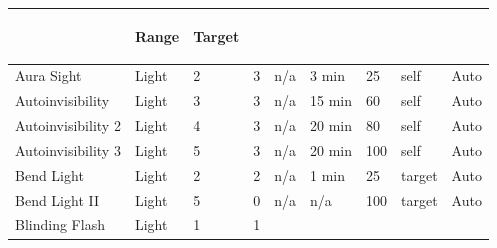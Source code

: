 \documentclass[twoside]{book}
\begin{document}
\begin{longtable}{p{1.25in}lp{2em}p{3em}llp{7em}ll}
  &
  \begin{turn}{70}{Range}\end{turn}
          
  &
  \begin{turn}{70}{Target}\end{turn}
          
  \\
  \endhead
      
  \raggedright
           Aura Sight 
  &
   Light 
  &
   2 
  &
   3
           
  &
   n/a 
  &
   3 min
           
  &
   25
           
  &
   self 
  &
   Auto 
  \tabularnewline
  \hline
      
  \raggedright
           Autoinvisibility 
  &
   Light 
  &
   3 
  &
   3
           
  &
   n/a 
  &
   15 min
           
  &
   60
           
  &
   self 
  &
   Auto 
  \tabularnewline
  \hline
      
  \raggedright
           Autoinvisibility 2 
  &
   Light 
  &
   4 
  &
   3
           
  &
   n/a 
  &
   20 min
           
  &
   80
           
  &
   self 
  &
   Auto 
  \tabularnewline
  \hline
      
  \raggedright
           Autoinvisibility 3 
  &
   Light 
  &
   5 
  &
   3
           
  &
   n/a 
  &
   20 min
           
  &
   100
           
  &
   self 
  &
   Auto 
  \tabularnewline
  \hline
      
  \raggedright
           Bend Light 
  &
   Light 
  &
   2 
  &
   2
           
  &
   n/a 
  &
   1 min
           
  &
   25
           
  &
   target 
  &
   Auto 
  \tabularnewline
  \hline
      
  \raggedright
           Bend Light II 
  &
   Light 
  &
   5 
  &
   0
           
  &
   n/a 
  &
   n/a 
  &
   100
           
  &
   target 
  &
   Auto 
  \tabularnewline
  \hline
      
  \raggedright
           Blinding Flash 
  &
   Light 
  &
   1 
  &
   1
           

\end{longtable}
\end{document}
